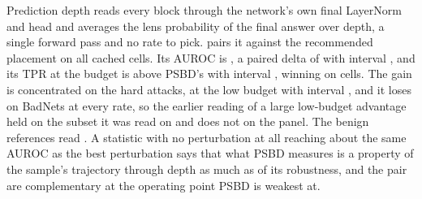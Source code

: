 \documentclass[../main.tex]{subfiles}
\begin{document}
Prediction depth \citep{baldock2021difficulty} reads every block through the network's own final LayerNorm and head and averages the lens probability of the final answer over depth, a single forward pass and no rate to pick.  pairs it against the recommended placement on all \DepthCells{} cached cells. Its AUROC is \DepthAurocAll{}, a paired delta of \DepthMinusPsbdAuroc{} with interval \DepthMinusPsbdAurocCi{}, and its TPR at the \LowestQuantilePercent{} budget is \DepthMinusPsbdTpr{} above PSBD's with interval \DepthMinusPsbdTprCi{}, winning on \DepthTprWins{} cells. The gain is concentrated on the hard attacks, \DepthMinusPsbdTprHard{} at the low budget with interval \DepthMinusPsbdTprHardCi{}, and it loses on BadNets at every rate, so the earlier reading of a large low-budget advantage held on the subset it was read on and does not on the panel. The benign references read \DepthBenignAuroc{}. A statistic with no perturbation at all reaching about the same AUROC as the best perturbation says that what PSBD measures is a property of the sample's trajectory through depth as much as of its robustness, and the pair are complementary at the operating point PSBD is weakest at.


\end{document}
